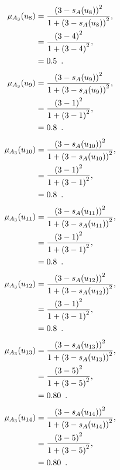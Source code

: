 \documentclass[a4paper,openany]{book}
\begin{document}
				\begin{align}
					\mu_{A_3}(u_8) &= \frac{\left(3-s_A(u_8)\right)^2}{1 + \left(3-s_A(u_8)\right)^2} ,\\
					&= \frac{\left(3-4\right)^2}{1 + \left(3-4\right)^2} \notag ,\\
					&= 0.5 \enspace. \notag
				\end{align}
				\begin{align}
					\mu_{A_3}(u_9) &= \frac{\left(3-s_A(u_9)\right)^2}{1 + \left(3-s_A(u_9)\right)^2} ,\\
					&= \frac{\left(3-1\right)^2}{1 + \left(3-1\right)^2} \notag ,\\
					&= 0.8 \enspace. \notag
				\end{align}
				\begin{align}
					\mu_{A_3}(u_{10}) &= \frac{\left(3-s_A(u_{10})\right)^2}{1 + \left(3-s_A(u_{10})\right)^2} ,\\
					&= \frac{\left(3-1\right)^2}{1 + \left(3-1\right)^2} \notag ,\\
					&= 0.8 \enspace. \notag
				\end{align}
				\begin{align}
					\mu_{A_3}(u_{11}) &= \frac{\left(3-s_A(u_{11})\right)^2}{1 + \left(3-s_A(u_{11})\right)^2} ,\\
					&= \frac{\left(3-1\right)^2}{1 + \left(3-1\right)^2} \notag ,\\
					&= 0.8 \enspace. \notag
				\end{align}
				\begin{align}
					\mu_{A_3}(u_{12}) &= \frac{\left(3-s_A(u_{12})\right)^2}{1 + \left(3-s_A(u_{12})\right)^2} ,\\
					&= \frac{\left(3-1\right)^2}{1 + \left(3-1\right)^2} \notag ,\\
					&= 0.8 \enspace. \notag
				\end{align}
				\begin{align}
					\mu_{A_3}(u_{13}) &= \frac{\left(3-s_A(u_{13})\right)^2}{1 + \left(3-s_A(u_{13})\right)^2} ,\\
					&= \frac{\left(3-5\right)^2}{1 + \left(3-5\right)^2} \notag ,\\
					&= 0.80 \enspace. \notag
				\end{align}
				\begin{align}
					\mu_{A_3}(u_{14}) &= \frac{\left(3-s_A(u_{14})\right)^2}{1 + \left(3-s_A(u_{14})\right)^2} ,\\
					&= \frac{\left(3-5\right)^2}{1 + \left(3-5\right)^2} \notag ,\\
					&= 0.80 \enspace. \notag
				\end{align}
\end{document}
